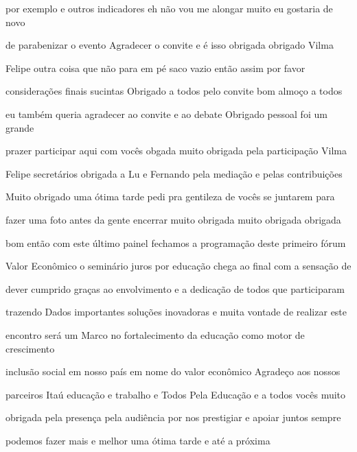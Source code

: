 \documentclass[a4paper,12pt]{article}
\begin{document}
por exemplo e outros indicadores eh não vou me alongar muito eu gostaria de novo

de parabenizar o evento Agradecer o convite e é isso obrigada obrigado Vilma

Felipe outra coisa que não para em pé saco vazio então assim por favor

considerações finais sucintas Obrigado a todos pelo convite bom almoço a todos

eu também queria agradecer ao convite e ao debate Obrigado pessoal foi um grande

prazer participar aqui com vocês obgada muito obrigada pela participação Vilma

Felipe secretários obrigada a Lu e Fernando pela mediação e pelas contribuições

Muito obrigado uma ótima tarde pedi pra gentileza de vocês se juntarem para

fazer uma foto antes da gente encerrar muito obrigada muito obrigada obrigada

bom então com este último painel fechamos a programação deste primeiro fórum

Valor Econômico o seminário juros por educação chega ao final com a sensação de

dever cumprido graças ao envolvimento e a dedicação de todos que participaram

trazendo Dados importantes soluções inovadoras e muita vontade de realizar este

encontro será um Marco no fortalecimento da educação como motor de crescimento

inclusão social em nosso país em nome do valor econômico Agradeço aos nossos

parceiros Itaú educação e trabalho e Todos Pela Educação e a todos vocês muito

obrigada pela presença pela audiência por nos prestigiar e apoiar juntos sempre

podemos fazer mais e melhor uma ótima tarde e até a próxima
\end{document}
